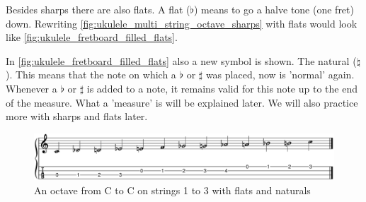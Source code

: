 \newpage

Besides sharps there are also flats. A flat ($\flat$) means to go a halve tone (one fret) down. Rewriting \autoref{fig:ukulele_multi_string_octave_sharps} with flats would look like \autoref{fig:ukulele_fretboard_filled_flats}.

In \autoref{fig:ukulele_fretboard_filled_flats} also a new symbol is shown. The natural ($\natural$). This means that the note on which a $\flat$ or $\sharp$ was placed, now is 'normal' again. Whenever a $\flat$ or $\sharp$ is added to a note, it remains valid for this note up to the end of the measure. What a 'measure' is will be explained later. We will also practice more with sharps and flats later.

\begin{figure}[h]
    \centering
    \includegraphics[width=\textwidth]{../../MuseScore/Ukulele/UkuleleChromaticNotesFlatsMultiString.png}
    \caption{An octave from C to C on strings 1 to 3 with flats and naturals}
    \label{fig:ukulele_fretboard_filled_flats}
\end{figure}